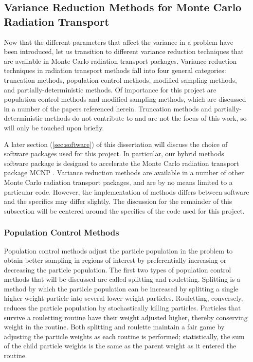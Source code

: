 \subsection{Variance Reduction Methods for Monte Carlo Radiation Transport}
\label{subsec:MCVR}

Now that the different parameters that affect the variance in a problem have
been introduced, let us transition to different variance reduction techniques
that are available in Monte Carlo radiation transport packages.
Variance reduction
techniques in radiation transport methods fall
into four general categories: truncation methods, population control methods, modified
sampling methods, and partially-deterministic methods. Of importance for this
project are
population control methods and modified sampling methods, which are discussed in
a number
of the papers referenced herein. Truncation methods and partially-deterministic
methods do not contribute to and are not the focus of this work,
so will only be touched upon briefly.

A later section (\ref{sec:software}) of this dissertation will discuss the
choice of software packages used
for this project. In particular, our hybrid methods software package is designed
to accelerate the Monte Carlo radiation transport package MCNP
\cite{hendricks_mcnp_1985, brown_mcnp_2002, mcnp_manual_v1}. Variance reduction
methods are available in a number of other Monte Carlo radiation transport
packages, and are by no
means limited to a particular code. However, the implementation of methods
differs between software
and the specifics may differ slightly. The discussion
for the remainder of this subsection will be centered around the specifics of
the code used for this project.

\subsubsection*{Population Control Methods}

Population control methods adjust the particle population in the problem to
obtain better sampling in regions of interest by preferentially increasing or
decreasing the particle population.
The first two types of population control methods that will be discussed
are called splitting and rouletting.
Splitting is a method by which the particle population can be increased by
splitting a single higher-weight particle into several lower-weight particles.
Rouletting, conversely, reduces the particle population by stochastically
killing particles. Particles that survive a rouletting routine have their weight
adjusted higher, thereby conserving weight in the routine.
Both splitting and roulette maintain a
fair game by adjusting the particle weights as each routine is
performed; statistically, the sum of the child particle weights
is the same as the parent
weight as it entered the routine.

